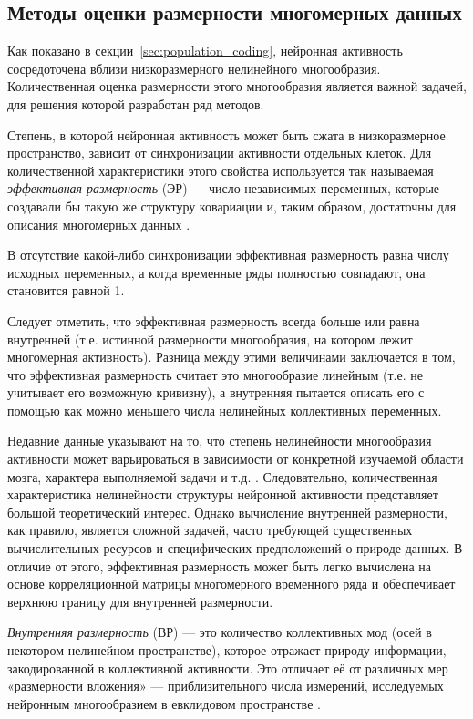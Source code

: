 \subsection{Методы оценки размерности многомерных данных}\label{sec:lit_dimensionality}
Как показано в секции~\ref{sec:population_coding}, нейронная активность сосредоточена вблизи низкоразмерного нелинейного многообразия. Количественная оценка размерности этого многообразия является важной задачей, для решения которой разработан ряд методов.

Степень, в которой нейронная активность может быть сжата в низкоразмерное пространство, зависит от синхронизации активности отдельных клеток. Для количественной характеристики этого свойства используется так называемая \emph{эффективная размерность} (ЭР) — число независимых переменных, которые создавали бы такую же структуру ковариации и, таким образом, достаточны для описания многомерных данных \cite{edim}.

В отсутствие какой-либо синхронизации эффективная размерность равна числу исходных переменных, а когда временные ряды полностью совпадают, она становится равной 1.

Следует отметить, что эффективная размерность всегда больше или равна внутренней (т.е. истинной размерности многообразия, на котором лежит многомерная активность). Разница между этими величинами заключается в том, что эффективная размерность считает это многообразие линейным (т.е. не учитывает его возможную кривизну), а внутренняя пытается описать его с помощью как можно меньшего числа нелинейных коллективных переменных.

Недавние данные указывают на то, что степень нелинейности многообразия активности может варьироваться в зависимости от конкретной изучаемой области мозга, характера выполняемой задачи и т.д. \cite{De2023, Fortunato2023}. Следовательно, количественная характеристика нелинейности структуры нейронной активности представляет большой теоретический интерес. Однако вычисление внутренней размерности, как правило, является сложной задачей, часто требующей существенных вычислительных ресурсов и специфических предположений о природе данных. В отличие от этого, эффективная размерность может быть легко вычислена на основе корреляционной матрицы многомерного временного ряда и обеспечивает верхнюю границу для внутренней размерности.

\textit{Внутренняя размерность} (ВР) — это количество коллективных мод (осей в некотором нелинейном пространстве), которое отражает природу информации, закодированной в коллективной активности. Это отличает её от различных мер «размерности вложения» — приблизительного числа измерений, исследуемых нейронным многообразием в евклидовом пространстве \cite{Jazayeri2021}.
